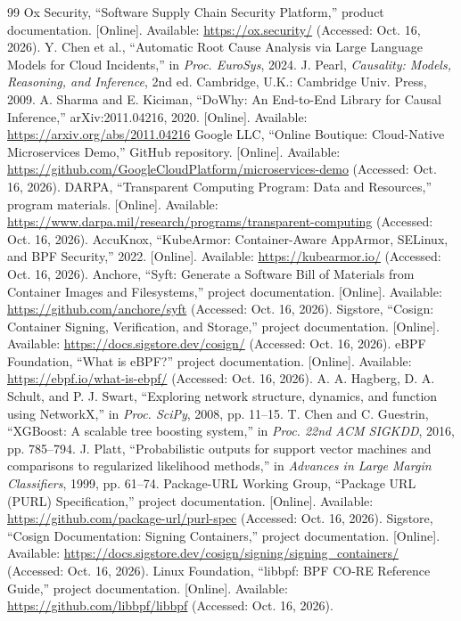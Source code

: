 \documentclass[conference]{IEEEtran}
\begin{document}
\begin{thebibliography}{99}
 Ox Security, ``Software Supply Chain Security Platform,'' product documentation. [Online]. Available: \url{https://ox.security/} (Accessed: Oct. 16, 2026).
 Y. Chen et al., ``Automatic Root Cause Analysis via Large Language Models for Cloud Incidents,'' in \emph{Proc. EuroSys}, 2024.
 J. Pearl, \emph{Causality: Models, Reasoning, and Inference}, 2nd ed. Cambridge, U.K.: Cambridge Univ. Press, 2009.
 A. Sharma and E. Kiciman, ``DoWhy: An End-to-End Library for Causal Inference,'' arXiv:2011.04216, 2020. [Online]. Available: \url{https://arxiv.org/abs/2011.04216}
 Google LLC, ``Online Boutique: Cloud-Native Microservices Demo,'' GitHub repository. [Online]. Available: \url{https://github.com/GoogleCloudPlatform/microservices-demo} (Accessed: Oct. 16, 2026).
 DARPA, ``Transparent Computing Program: Data and Resources,'' program materials. [Online]. Available: \url{https://www.darpa.mil/research/programs/transparent-computing} (Accessed: Oct. 16, 2026).
 AccuKnox, ``KubeArmor: Container-Aware AppArmor, SELinux, and BPF Security,'' 2022. [Online]. Available: \url{https://kubearmor.io/} (Accessed: Oct. 16, 2026).
 Anchore, ``Syft: Generate a Software Bill of Materials from Container Images and Filesystems,'' project documentation. [Online]. Available: \url{https://github.com/anchore/syft} (Accessed: Oct. 16, 2026).
 Sigstore, ``Cosign: Container Signing, Verification, and Storage,'' project documentation. [Online]. Available: \url{https://docs.sigstore.dev/cosign/} (Accessed: Oct. 16, 2026).
 eBPF Foundation, ``What is eBPF?'' project documentation. [Online]. Available: \url{https://ebpf.io/what-is-ebpf/} (Accessed: Oct. 16, 2026).
 A. A. Hagberg, D. A. Schult, and P. J. Swart, ``Exploring network structure, dynamics, and function using NetworkX,'' in \emph{Proc. SciPy}, 2008, pp. 11--15.
 T. Chen and C. Guestrin, ``XGBoost: A scalable tree boosting system,'' in \emph{Proc. 22nd ACM SIGKDD}, 2016, pp. 785--794.
 J. Platt, ``Probabilistic outputs for support vector machines and comparisons to regularized likelihood methods,'' in \emph{Advances in Large Margin Classifiers}, 1999, pp. 61--74.
 Package-URL Working Group, ``Package URL (PURL) Specification,'' project documentation. [Online]. Available: \url{https://github.com/package-url/purl-spec} (Accessed: Oct. 16, 2026).
 Sigstore, ``Cosign Documentation: Signing Containers,'' project documentation. [Online]. Available: \url{https://docs.sigstore.dev/cosign/signing/signing_containers/} (Accessed: Oct. 16, 2026).
 Linux Foundation, ``libbpf: BPF CO-RE Reference Guide,'' project documentation. [Online]. Available: \url{https://github.com/libbpf/libbpf} (Accessed: Oct. 16, 2026).
\end{thebibliography}
\end{document}

